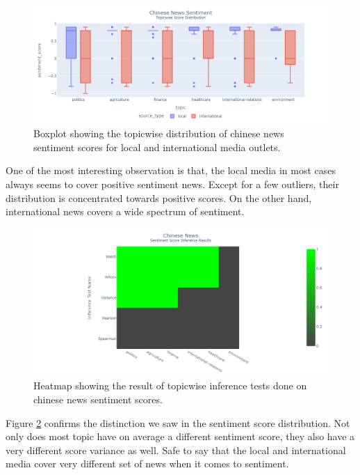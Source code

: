 \documentclass{article}
\theoremstyle{mytheoremstyle}
\theoremstyle{mytheoremstyle}
\theoremstyle{myproblemstyle}
\begin{document}
    \begin{figure}[hp]
        \centering
        \includegraphics[width=\linewidth]{../images/plots/China/china_boxplot_sentiment.png}
        \caption{Boxplot showing the topicwise distribution of chinese news sentiment scores for local and international media outlets.}
        \label{fig:china_sentiment_score_boxplot}
    \end{figure}  

    One of the most interesting observation is that, the local media in most cases always seems to cover positive sentiment news. Except for a few outliers, their distribution is concentrated towards positive scores. On the other hand, international news covers a wide spectrum of sentiment. 

    \begin{figure}[hp]
        \centering
        \includegraphics[width=\linewidth]{../images/plots/China/china_heatmap_inference_sentiment.png}
        \caption{Heatmap showing the result of topicwise inference tests done on chinese news sentiment scores.}
        \label{fig:china_sentiment_score_heatmap}
    \end{figure}

    Figure \ref{fig:china_sentiment_score_heatmap} confirms the distinction we saw in the sentiment score distribution. Not only does most topic have on average a different sentiment score, they also have a very different score variance as well. Safe to say that the local and international media cover very different set of news when it comes to sentiment.
    
\end{document}
